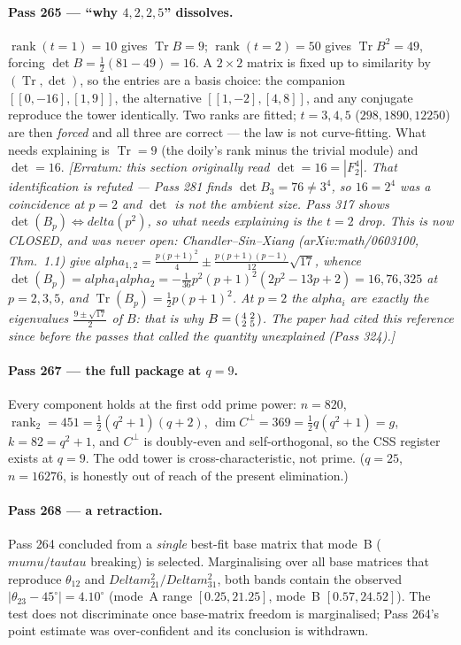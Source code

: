 \documentclass[12pt,a4paper]{article}
\def\mathbf#1{#1}%
\def\textbf#1{#1}%
\def\alpha{alpha}%
\def\delta{delta}%
\def\Delta{Delta}%
\def\mu{mu}%
\def\tau{tau}%
\theoremstyle{definition}
\begin{document}
\paragraph{Pass 265 --- ``why $4,2,2,5$'' dissolves.} $\operatorname{rank}(t{=}1)=10$
gives $\operatorname{Tr}B=9$; $\operatorname{rank}(t{=}2)=50$ gives
$\operatorname{Tr}B^2=49$, forcing $\det B=\tfrac12(81-49)=16$. A $2\times2$ matrix
is fixed up to similarity by $(\operatorname{Tr},\det)$, so the entries are a basis
choice: the companion $[[0,-16],[1,9]]$, the alternative $[[1,-2],[4,8]]$, and any
conjugate reproduce the tower identically. Two ranks are fitted; $t=3,4,5$
($298,1890,12250$) are then \emph{forced} and all three are correct --- the law is
not curve-fitting. What needs explaining is $\operatorname{Tr}=9$ (the doily's rank
minus the trivial module) and $\det=16$.
\emph{[Erratum: this section originally read $\det=16=|\mathbf F_2^4|$. That identification is \textbf{refuted} --- Pass 281 finds $\det B_3=76\neq3^4$, so $16=2^4$ was a coincidence at $p=2$ and $\det$ is not the ambient size. Pass 317 shows $\det(B_p)\iff\delta(p^2)$, so what needs explaining is the $t=2$ drop. \textbf{This is now CLOSED, and was never open}: Chandler--Sin--Xiang (arXiv:math/0603100, Thm.~1.1) give $\alpha_{1,2}=\tfrac{p(p+1)^2}4\pm\tfrac{p(p+1)(p-1)}{12}\sqrt{17}$, whence $\det(B_p)=\alpha_1\alpha_2=-\tfrac1{36}p^2(p+1)^2(2p^2{-}13p{+}2)=16,76,325$ at $p=2,3,5$, and $\operatorname{Tr}(B_p)=\tfrac12p(p+1)^2$. At $p=2$ the $\alpha_i$ are exactly the eigenvalues $\tfrac{9\pm\sqrt{17}}2$ of $B$: \emph{that} is why $B=\begin{psmallmatrix}4&2\\2&5\end{psmallmatrix}$. The paper had cited this reference since before the passes that called the quantity unexplained (Pass 324).]}

\paragraph{Pass 267 --- the full package at $q=9$.} Every component holds at the
first odd prime power: $n=820$, $\operatorname{rank}_2=451=\tfrac12(q^2+1)(q+2)$,
$\dim C^{\perp}=369=\tfrac12 q(q^2+1)=g$, $k=82=q^2+1$, and $C^{\perp}$ is
doubly-even and self-orthogonal, so the CSS register exists at $q=9$. The odd
tower is cross-characteristic, not prime. ($q=25$, $n=16276$, is honestly out of
reach of the present elimination.)

\paragraph{Pass 268 --- a retraction.} Pass 264 concluded from a \emph{single}
best-fit base matrix that mode~B ($\mu\mu/\tau\tau$ breaking) is selected.
Marginalising over all base matrices that reproduce $\theta_{12}$ and
$\Delta m^2_{21}/\Delta m^2_{31}$, both bands contain the observed
$|\theta_{23}-45^\circ|=4.10^\circ$ (mode~A range $[0.25,21.25]$, mode~B
$[0.57,24.52]$). \textbf{The test does not discriminate once base-matrix freedom is
marginalised; Pass 264's point estimate was over-confident and its conclusion is
withdrawn.}
\end{document}
